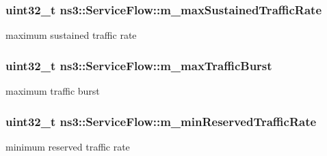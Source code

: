 \subsubsection[{\texorpdfstring{m\+\_\+max\+Sustained\+Traffic\+Rate}{m_maxSustainedTrafficRate}}]{\setlength{\rightskip}{0pt plus 5cm}uint32\+\_\+t ns3\+::\+Service\+Flow\+::m\+\_\+max\+Sustained\+Traffic\+Rate\hspace{0.3cm}{\ttfamily [private]}}\hypertarget{classns3_1_1ServiceFlow_a604d5dcda6dbb58528799cf439584ecb}{}\label{classns3_1_1ServiceFlow_a604d5dcda6dbb58528799cf439584ecb}


maximum sustained traffic rate 

\subsubsection[{\texorpdfstring{m\+\_\+max\+Traffic\+Burst}{m_maxTrafficBurst}}]{\setlength{\rightskip}{0pt plus 5cm}uint32\+\_\+t ns3\+::\+Service\+Flow\+::m\+\_\+max\+Traffic\+Burst\hspace{0.3cm}{\ttfamily [private]}}\hypertarget{classns3_1_1ServiceFlow_a6d99ed08420605f4f56188eced87ccd0}{}\label{classns3_1_1ServiceFlow_a6d99ed08420605f4f56188eced87ccd0}


maximum traffic burst 

\subsubsection[{\texorpdfstring{m\+\_\+min\+Reserved\+Traffic\+Rate}{m_minReservedTrafficRate}}]{\setlength{\rightskip}{0pt plus 5cm}uint32\+\_\+t ns3\+::\+Service\+Flow\+::m\+\_\+min\+Reserved\+Traffic\+Rate\hspace{0.3cm}{\ttfamily [private]}}\hypertarget{classns3_1_1ServiceFlow_a54dc771349ed7d93631e4a44299838d7}{}\label{classns3_1_1ServiceFlow_a54dc771349ed7d93631e4a44299838d7}


minimum reserved traffic rate 

